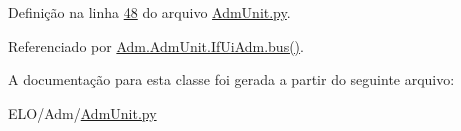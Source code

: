 Definição na linha \hyperlink{AdmUnit_8py_source_l00048}{48} do arquivo \hyperlink{AdmUnit_8py_source}{Adm\-Unit.\-py}.



Referenciado por \hyperlink{classAdm_1_1AdmUnit_1_1IfUiAdm_a4863c3ebab6e5fac647ab32415153470}{Adm.\-Adm\-Unit.\-If\-Ui\-Adm.\-bus()}.



A documentação para esta classe foi gerada a partir do seguinte arquivo\-:\begin{DoxyCompactItemize}
\item 
E\-L\-O/\-Adm/\hyperlink{AdmUnit_8py}{Adm\-Unit.\-py}\end{DoxyCompactItemize}
